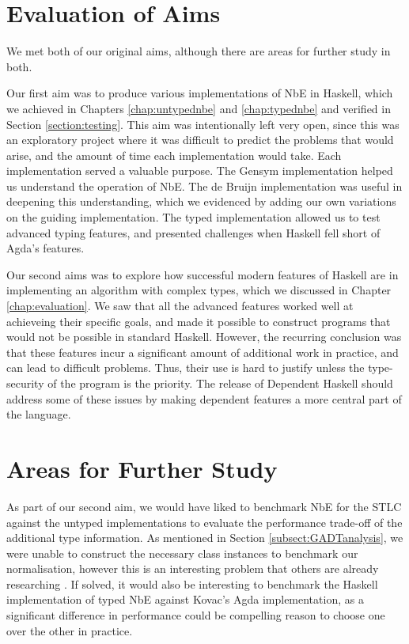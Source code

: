 \section{Evaluation of Aims}

We met both of our original aims, although there are areas for further study in both.

Our first aim was to produce various implementations of NbE in Haskell, which we achieved in Chapters \ref{chap:untypednbe} and \ref{chap:typednbe} and verified in Section \ref{section:testing}. This aim was intentionally left very open, since this was an exploratory project where it was difficult to predict the problems that would arise, and the amount of time each implementation would take. Each implementation served a valuable purpose. The Gensym implementation helped us understand the operation of NbE. The de Bruijn implementation was useful in deepening this understanding, which we evidenced by adding our own variations on the guiding implementation. The typed implementation allowed us to test advanced typing features, and presented challenges when Haskell fell short of Agda's features.

Our second aims was to explore how successful modern features of Haskell are in implementing an algorithm with complex types, which we discussed in Chapter \ref{chap:evaluation}. We saw that all the advanced features worked well at achieveing their specific goals, and made it possible to construct programs that would not be possible in standard Haskell. However, the recurring conclusion was that these features incur a significant amount of additional work in practice, and can lead to difficult problems. Thus, their use is hard to justify unless the type-security of the program is the priority. The release of Dependent Haskell \cite{DH} should address some of these issues by making dependent features a more central part of the language.

\section{Areas for Further Study}

As part of our second aim, we would have liked to benchmark NbE for the STLC against the untyped implementations to evaluate the performance trade-off of the additional type information. As mentioned in Section \ref{subsect:GADTanalysis}, we were unable to construct the necessary class instances to benchmark our normalisation, however this is an interesting problem that others are already researching \cite{gadtClassInstances}. If solved, it would also be interesting to benchmark the Haskell implementation of typed NbE against Kovac's Agda implementation, as a significant difference in performance could be compelling reason to choose one over the other in practice.

